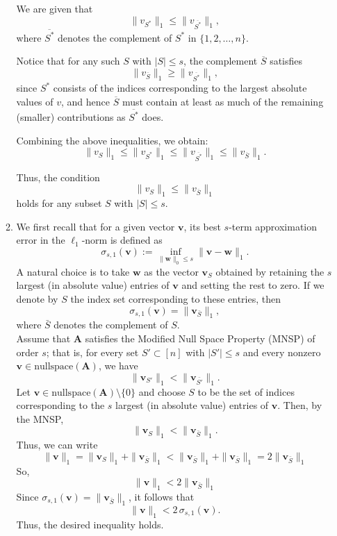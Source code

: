 \documentclass{article}
\begin{document}
\begin{enumerate}
\begin{enumerate}
We are given that
\[
\|v_{S^*}\|_1 \leq \|v_{\overline{S^*}}\|_1,
\]
where \( \overline{S^*} \) denotes the complement of \( S^* \) in \( \{1,2,\dots,n\} \).

Notice that for any such \( S \) with \( |S| \le s \), the complement \( \overline{S} \) satisfies
\[
\|v_{\overline{S}}\|_1 \geq \|v_{\overline{S^*}}\|_1,
\]
since \( S^* \) consists of the indices corresponding to the largest absolute values of \( v \), and hence \( \overline{S} \) must contain at least as much of the remaining (smaller) contributions as \( \overline{S^*} \) does.

Combining the above inequalities, we obtain:
\[
\|v_S\|_1 \leq \|v_{S^*}\|_1 \leq \|v_{\overline{S^*}}\|_1 \leq \|v_{\overline{S}}\|_1.
\]

Thus, the condition
\[
\|v_S\|_1 \leq \|v_{\overline{S}}\|_1
\]
holds for any subset \( S \) with \( |S| \le s \).
    \item We first recall that for a given vector \(\boldsymbol{v}\), its best \(s\)-term approximation error in the \(\ell_1\)-norm is defined as 
\[
\sigma_{s,1}(\boldsymbol{v}) := \inf_{\|\boldsymbol{w}\|_0 \le s} \|\boldsymbol{v} - \boldsymbol{w}\|_1.
\]
A natural choice is to take \(\boldsymbol{w}\) as the vector \(\boldsymbol{v}_S\) obtained by retaining the \(s\) largest (in absolute value) entries of \(\boldsymbol{v}\) and setting the rest to zero. If we denote by \(S\) the index set corresponding to these entries, then
\[
\sigma_{s,1}(\boldsymbol{v}) = \|\boldsymbol{v}_{\bar{S}}\|_1,
\]
where \(\bar{S}\) denotes the complement of \(S\).
 \\

Assume that \(\boldsymbol{A}\) satisfies the Modified Null Space Property (MNSP) of order \(s\); that is, for every set \(S' \subset [n]\) with \(|S'|\le s\) and every nonzero \(\boldsymbol{v} \in \textrm{nullspace}(\boldsymbol{A})\), we have
\[
\|\boldsymbol{v}_{S'}\|_1 < \|\boldsymbol{v}_{\bar{S'}}\|_1.
\]
Let \(\boldsymbol{v}\in \textrm{nullspace}(\boldsymbol{A})\setminus \{0\}\) and choose \(S\) to be the set of indices corresponding to the \(s\) largest (in absolute value) entries of \(\boldsymbol{v}\). Then, by the MNSP,
\[
\|\boldsymbol{v}_S\|_1 < \|\boldsymbol{v}_{\bar{S}}\|_1.
\]
Thus, we can write
\[
\|\boldsymbol{v}\|_1 = \|\boldsymbol{v}_S\|_1 + \|\boldsymbol{v}_{\bar{S}}\|_1 < \|\boldsymbol{v}_{\bar{S}}\|_1 + \|\boldsymbol{v}_{\bar{S}}\|_1 = 2\|\boldsymbol{v}_{\bar{S}}\|_1
\]
So,
\[
\|\boldsymbol{v}\|_1 < 2\|\boldsymbol{v}_{\bar{S}}\|_1
\]
Since \(\sigma_{s,1}(\boldsymbol{v}) = \|\boldsymbol{v}_{\bar{S}}\|_1\), it follows that
\[
\|\boldsymbol{v}\|_1 < 2\,\sigma_{s,1}(\boldsymbol{v}).
\]
Thus, the desired inequality holds.


\end{enumerate}
\end{enumerate}
\end{document}
